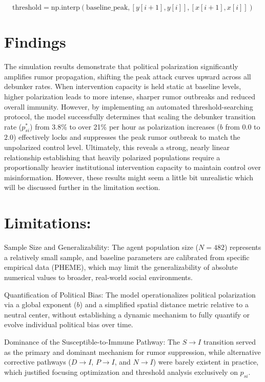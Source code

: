 \documentclass[11pt]{article}
\begin{document}
 $$\text{threshold} = \text{np.interp}\left(\text{baseline\_peak}, [y[i+1], y[i]], [x[i+1], x[i]]\right)$$

 \section{Findings}

The simulation results demonstrate that political polarization significantly amplifies rumor propagation, shifting the peak attack curves upward across all debunker rates. When intervention capacity is held static at baseline levels, higher polarization leads to more intense, sharper rumor outbreaks and reduced overall immunity. However, by implementing an automated threshold-searching protocol, the model successfully determines that scaling the debunker transition rate ($p_{si}^*$) from 3.8\% to over 21\% per hour as polarization increases ($b$ from $0.0$ to $2.0$) effectively locks and suppresses the peak rumor outbreak to match the unpolarized control level. Ultimately, this reveals a strong, nearly linear relationship establishing that heavily polarized populations require a proportionally heavier institutional intervention capacity to maintain control over misinformation. However, these results might seem a little bit unrealistic which will be discussed further in the limitation section.

 \section{Limitations:}

Sample Size and Generalizability: The agent population size ($N = 482$) represents a relatively small sample, and baseline parameters are calibrated from specific empirical data (PHEME), which may limit the generalizability of absolute numerical values to broader, real-world social environments. 

Quantification of Political Bias: The model operationalizes political polarization via a global exponent ($b$) and a simplified spatial distance metric relative to a neutral center, without establishing a dynamic mechanism to fully quantify or evolve individual political bias over time.

Dominance of the Susceptible-to-Immune Pathway: The $S \to I$ transition served as the primary and dominant mechanism for rumor suppression, while alternative corrective pathways ($D \to I$, $P \to I$, and $N \to I$) were barely existent in practice, which justified focusing optimization and threshold analysis exclusively on $p_{si}$.
\end{document}
